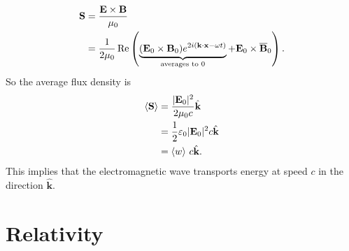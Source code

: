 \documentclass{article}
\begin{document}
\begin{align*}
	\mathbf S &= \frac{\mathbf E \times\mathbf B}{\mu_0} \\
		  &=\frac 1{2\mu_0}\operatorname{Re}\left(\underbrace{(\mathbf E_0\times\mathbf B_0)e^{2i(\mathbf k \cdot \mathbf{x} - \omega t)}}_{\text{averages to } 0}+\mathbf E_0\times\overline{\mathbf B}_0\right).
\end{align*}
So the average flux density is
\begin{align*}
	\langle \mathbf S\rangle &= \frac{|\mathbf E_0|^2}{2\mu_0 c}\hat{\mathbf k} \\
				 &= \frac 12 \varepsilon_0 |\mathbf E_0|^2 c \hat{\mathbf k} \\
				 &=\langle w \rangle\  c\hat{\mathbf k}.
\end{align*}
This implies that the electromagnetic wave transports energy at speed $ c $ in the direction $ \hat{\mathbf k} $.
\section{Relativity}
\end{document}
